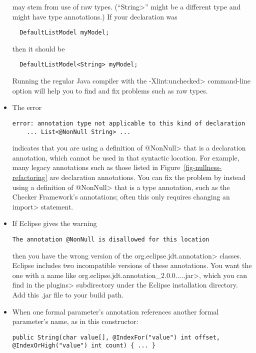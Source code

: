 \begin{itemize}
\noindent
may stem from use of raw types.  (``\<String>'' might be a different type
and might have type annotations.)  If your declaration was

\begin{Verbatim}
  DefaultListModel myModel;
\end{Verbatim}

\noindent
then it should be
\begin{Verbatim}
  DefaultListModel<String> myModel;
\end{Verbatim}

Running the regular Java compiler with the \<-Xlint:unchecked> command-line
option will help you to find and fix problems such as raw types.


\item
The error

\begin{Verbatim}
error: annotation type not applicable to this kind of declaration
    ... List<@NonNull String> ...
\end{Verbatim}

\noindent
indicates that you are using a definition of \<@NonNull> that is a
declaration annotation, which cannot be used in that syntactic location.
For example, many legacy annotations such as those listed in
Figure~\ref{fig-nullness-refactoring} are declaration annotations.  You can
fix the problem by instead using a definition of \<@NonNull> that is a type
annotation, such as the Checker Framework's annotations; often this only
requires changing an \<import> statement.


\item
If Eclipse gives the warning

\begin{Verbatim}
The annotation @NonNull is disallowed for this location
\end{Verbatim}

\noindent
then you have the wrong version of the \<org.eclipse.jdt.annotation>
classes.  Eclipse includes two incompatible versions of these annotations.
You want the one with a name like
\<org.eclipse.jdt.annotation\_2.0.0.....jar>, which you can find in the
\<plugins> subdirectory under the Eclipse installation directory.
Add this .jar file to your build path.


\item
When one formal parameter's annotation references another formal
parameter's name, as in this constructor:

\begin{smaller}
\begin{Verbatim}
public String(char value[], @IndexFor("value") int offset, @IndexOrHigh("value") int count) { ... }
\end{Verbatim}
\end{smaller}


\end{itemize}
